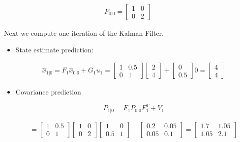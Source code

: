 \[\begin{aligned}
P_{0|0}
        = \begin{bmatrix}1 & 0 \\ 0 & 2\end{bmatrix}
\end{aligned}\]

Next we compute one iteration of the Kalman Filter.

\begin{itemize}
\item
  State estimate prediction:

  \[\begin{aligned}
  \hat{x}_{1|0} = F_{1}\hat{x}_{0|0} + G_{1} u_{1} =
  \begin{bmatrix}1 & 0.5 \\ 0 & 1\end{bmatrix}
              \begin{bmatrix}2 \\4 \end{bmatrix} + \begin{bmatrix}0
                \\ 0.5\end{bmatrix} 0 =
  \begin{bmatrix}4 \\ 4\end{bmatrix}
  \end{aligned}\]
\item
  Covariance prediction

  \[P_{1|0} = F_{1} P_{0|0} F_{1}^{T} + V_{1}\]

  \[\begin{aligned}
  = \begin{bmatrix}1 & 0.5 \\ 0 & 1\end{bmatrix}
  \begin{bmatrix}1 & 0 \\ 0 & 2\end{bmatrix}
  \begin{bmatrix}1 & 0 \\ 0.5 & 1\end{bmatrix} +
  \begin{bmatrix}0.2 & 0.05 \\ 0.05 & 0.1\end{bmatrix}
  = \begin{bmatrix}1.7 & 1.05 \\ 1.05 & 2.1\end{bmatrix}
  \end{aligned}\]
\end{itemize}

